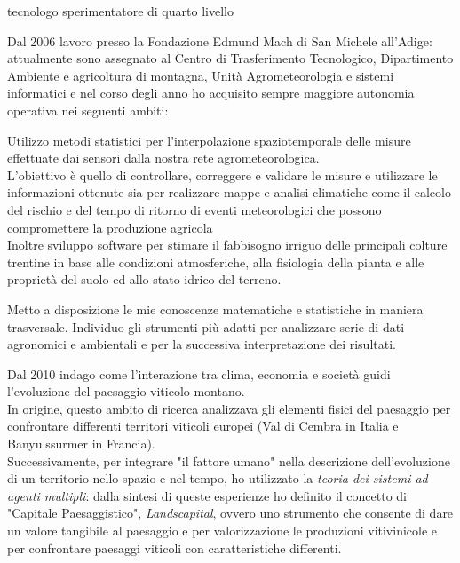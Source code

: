 \documentclass{curriculum}
\begin{document}
   {tecnologo sperimentatore di quarto livello}
  
    Dal 2006 lavoro presso la Fondazione Edmund Mach di San Michele all'Adige: attualmente sono assegnato al Centro di Trasferimento Tecnologico, Dipartimento Ambiente e agricoltura di montagna, Unità Agrometeorologia e sistemi informatici e nel corso degli anno ho acquisito sempre maggiore autonomia operativa nei seguenti ambiti:
    
    \begin{description}[style= unboxed, leftmargin= 6 pt, topsep= -3 pt, parsep= 3 pt, itemsep= 2pt]
     \item[Analisi di dati per il mio gruppo di lavoro.] Utilizzo metodi statistici per l'interpolazione spaziotemporale delle misure effettuate dai sensori dalla nostra rete agrometeorologica.\\
     L'obiettivo è quello di controllare, correggere e validare le misure e utilizzare le informazioni ottenute sia per realizzare mappe e analisi climatiche come il calcolo del rischio e del tempo di ritorno di eventi meteorologici che possono compromettere la produzione agricola\\
     Inoltre sviluppo software per stimare il fabbisogno irriguo delle principali colture trentine in base alle condizioni atmosferiche, alla fisiologia della pianta e alle proprietà del suolo ed allo stato idrico del terreno.
     \item[Analisi di dati a supporto di altri gruppi della Fondazione Mach.] Metto a disposizione le mie conoscenze matematiche e statistiche in maniera trasversale. Individuo gli strumenti più adatti per analizzare serie di dati agronomici e ambientali e per la successiva interpretazione dei risultati.
     \item[Studio dell'evoluzione dei paesaggi viticoli trentini] Dal 2010 indago come l'interazione tra clima, economia e società guidi l'evoluzione del paesaggio viticolo montano.\\
     In origine, questo ambito di ricerca analizzava gli elementi fisici del paesaggio per confrontare differenti territori viticoli europei (Val di Cembra in Italia e  Banyuls\textendash sur\textendash mer in Francia).\\
     Successivamente, per integrare "il fattore umano" nella descrizione dell'evoluzione di un territorio nello spazio e nel tempo, ho utilizzato la \textit{teoria dei sistemi ad agenti multipli}: dalla sintesi di queste esperienze ho definito il concetto  di "Capitale Paesaggistico", \textit{Landscapital}, ovvero uno strumento che consente di dare un valore tangibile al paesaggio e per valorizzazione le produzioni vitivinicole e per confrontare paesaggi viticoli con caratteristiche differenti. 

\end{description}
\end{document}
